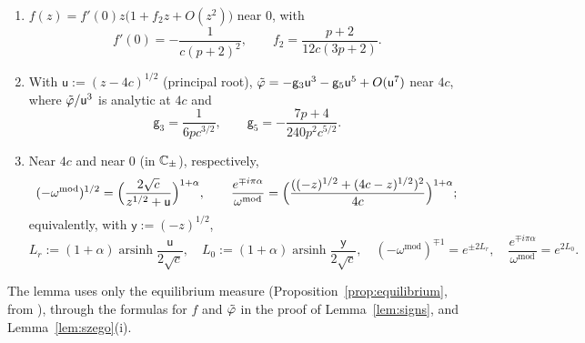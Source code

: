 \begin{lemma}\label{lem:local-data}
\begin{enumerate}
\item[(i)] $f(z)=f'(0)z\bigl(1+f_2z+O(z^2)\bigr)$ near $0$, with
  \[
    f'(0)=-\frac1{c(p+2)^2},\qquad f_2=\frac{p+2}{12c(3p+2)}.
  \]
\item[(ii)] With $\mathsf u:=(z-4c)^{1/2}$ (principal root), $\tilde\varphi=-\mathsf g_3\mathsf u^3-\mathsf g_5\mathsf u^5+O(\mathsf u^7)$ near
  $4c$, where $\tilde\varphi/\mathsf u^3$ is analytic at $4c$ and
  \[
    \mathsf g_3=\frac1{6pc^{3/2}},\qquad \mathsf g_5=-\frac{7p+4}{240p^2c^{5/2}}.
  \]
\item[(iii)] Near $4c$ and near $0$ (in $\mathbb{C}_\pm$), respectively,
  \[
    (-\omega^{\mathrm{mod}})^{1/2}=\Bigl(\frac{2\sqrt c}{z^{1/2}+\mathsf u}\Bigr)^{1+\alpha},\qquad
    \frac{e^{\mp i\pi\alpha}}{\omega^{\mathrm{mod}}}=\Bigl(\frac{((-z)^{1/2}+(4c-z)^{1/2})^2}{4c}\Bigr)^{1+\alpha};
  \]
  equivalently, with $\mathsf y:=(-z)^{1/2}$,
  \[
    L_r:=(1+\alpha)\operatorname{arsinh}\frac{\mathsf u}{2\sqrt c},\quad L_0:=(1+\alpha)\operatorname{arsinh}\frac{\mathsf y}{2\sqrt c},
    \quad(-\omega^{\mathrm{mod}})^{\mp1}=e^{\pm2L_r},\quad\frac{e^{\mp i\pi\alpha}}{\omega^{\mathrm{mod}}}=e^{2L_0}.
  \]
\end{enumerate}
\end{lemma}

The lemma uses only the equilibrium measure (Proposition~\ref{prop:equilibrium}, from \cite[Theorem~1.3]{Paper1}),
through the formulas for $f$ and $\tilde\varphi$ in the proof of Lemma~\ref{lem:signs}, and Lemma~\ref{lem:szego}(i).

